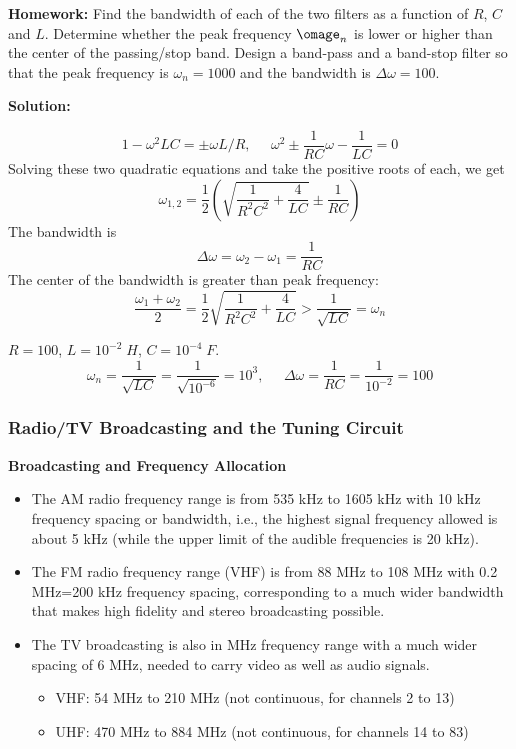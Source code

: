 
{\bf Homework:} Find the bandwidth of each of the two filters as 
a function of $R$, $C$ and $L$. Determine whether the peak frequency
$\omage_n$ is lower or higher than the center of the passing/stop
band. Design a band-pass and a band-stop filter so that the peak
frequency is $\omega_n=1000$ and the bandwidth is $\Delta\omega=100$.


\begin{comment}
\end{comment}


{\bf Solution:}

\[
1-\omega^2LC=\pm \omega L/R,\;\;\;\;\;
\omega^2\pm\frac{1}{RC}\omega-\frac{1}{LC}=0
\]
Solving these two quadratic equations and take the positive roots
of each, we get
\[
\omega_{1,2}=\frac{1}{2}\left(\sqrt{\frac{1}{R^2C^2}+\frac{4}{LC}}\pm
\frac{1}{RC}\right)
\]
The bandwidth is
\[
\Delta\omega=\omega_2-\omega_1=\frac{1}{RC}
\]
The center of the bandwidth is greater than peak frequency:
\[
\frac{\omega_1+\omega_2}{2}=\frac{1}{2}\sqrt{\frac{1}{R^2C^2}+\frac{4}{LC}}
>\frac{1}{\sqrt{LC}}=\omega_n
\]

$R=100$, $L=10^{-2}\;H$, $C=10^{-4}\;F$.
\[
\omega_n=\frac{1}{\sqrt{LC}}=\frac{1}{\sqrt{10^{-6}}}=10^3,
\;\;\;\;\;
\Delta\omega=\frac{1}{RC}=\frac{1}{10^{-2}}=100
\]


\subsubsection*{Radio/TV Broadcasting and the Tuning Circuit}

{\bf Broadcasting and Frequency Allocation}

\begin{itemize}
\item The AM radio frequency range is from 535 kHz to 1605 kHz with 10 kHz
  frequency spacing or bandwidth, i.e., the highest signal frequency allowed 
  is about 5 kHz (while the upper limit of the audible frequencies is 20 kHz). 
\item The FM radio frequency range (VHF) is from 88 MHz to 108 MHz with 
  0.2 MHz=200 kHz frequency spacing, corresponding to a much wider
  bandwidth that makes high fidelity and stereo broadcasting possible. 
\item The TV broadcasting is also in MHz frequency range with a much wider 
  spacing of 6 MHz, needed to carry video as well as audio signals. 
  \begin{itemize}
  \item VHF: 54 MHz to 210 MHz (not continuous, for channels 2 to 13) 
  \item UHF: 470 MHz to 884 MHz (not continuous, for channels 14 to 83)
  \end{itemize}
\end{itemize}

